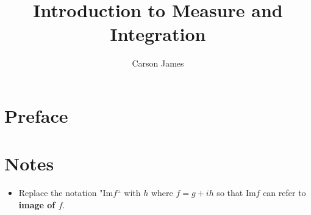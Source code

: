 \documentclass[12pt]{amsart}
\theoremstyle{definition}
\begin{document}
	
	\title{Introduction to Measure and Integration}
	\author{Carson James}
	\maketitle
	
	\tableofcontents
	
	\newpage
	
	\section*{Preface}
	\begin{flushleft}
	\end{flushleft}

	\vspace{.2cm}

	\begin{flushleft}
	\end{flushleft}
	
	
	\section*{Notes}
	\begin{itemize}
	\item Replace the notation "$\text{Im} f$`` with $h$ where $f = g + ih$ so that $\text{Im}f$ can refer to \textbf{image of $f$}.
\end{itemize}		
	
\end{document}
